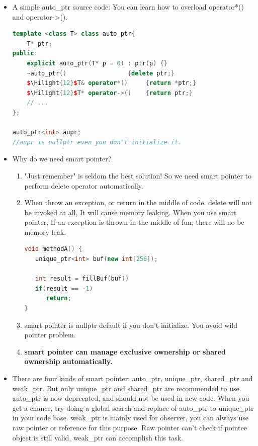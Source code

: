 \documentclass[a4paper,12pt,twoside]{book}
\newcommand{\Hilight}[1]{\makebox[0pt][l]{\color{yellow}\rule[-3pt]{#1em}{11pt}}}
\begin{document}
\begin{itemize}
\item A simple auto\_ptr source code: You can learn how to overload operator*() and operator->().
\begin{lstlisting}[frame=single, language=c++, mathescape=true]
template <class T> class auto_ptr{
    T* ptr;
public:
    explicit auto_ptr(T* p = 0) : ptr(p) {}
    ~auto_ptr()                 {delete ptr;}
    $\Hilight{12}$T& operator*()     {return *ptr;}
    $\Hilight{12}$T* operator->()    {return ptr;}
    // ...
};

auto_ptr<int> aupr;
//aupr is nullptr even you don't initialize it.
\end{lstlisting}

\item Why do we need smart pointer?
\begin{enumerate}
\item "Just remember" is seldom the best solution! So we need smart pointer to perform delete operator automatically.

\item When throw an exception, or return in the middle of code. delete will not be invoked at all, It will cause memory leaking. When you use smart pointer, If an exception is thrown in the middle of fun, there will no be memory leak.
\begin{lstlisting}[frame=single, language=c++]
void methodA() {
   unique_ptr<int> buf(new int[256]);

   int result = fillBuf(buf))
   if(result == -1)
      return;
}
\end{lstlisting}

\item smart pointer is nullptr default if you don't initialize. You avoid wild pointer problem.

\item \textbf{smart pointer can manage exclusive ownership or shared ownership automatically. }
\end{enumerate}

\item There are four kinds of smart pointer: auto\_ptr, unique\_ptr, shared\_ptr and weak\_ptr.  But only unique\_ptr and shared\_ptr are recommended to use. auto\_ptr is now deprecated, and should not be used in new code. When you get a chance, try doing a global search-and-replace of auto\_ptr to unique\_ptr in your code base. weak\_ptr is mainly used for observer, you can always use raw pointer or reference for this purpose. Raw pointer can't check if pointee object is still valid, weak\_ptr can accomplish this task.


\end{itemize}
\end{document}
